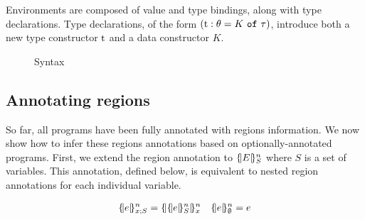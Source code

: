 
Environments are composed of value and type bindings, along with type
declarations. Type declarations, of the form
$\tydecl{t}{\kschm}{K}{\tau}$, introduce both a new type constructor $\T{t}$ and
a data constructor $K$.

\begin{figure*}[t]
  \centering
  
  \caption{Syntax}
  \label{grammar}
\end{figure*}

\clearpage

\subsection{Annotating regions}
\label{regionannot}

So far, all \lang programs have been fully annotated with regions information.
We now show how to infer these regions annotations based on
optionally-annotated programs.
First, we extend the region annotation to $\region{S}{E}$ where $S$ is
a set of variables. This annotation, defined below, is equivalent to nested
region annotations for each individual variable.

\begin{align*}
  \region{x;S}{e} &= \region{x}{\region{S}{e}}& \region{\emptyset}{e} &= e\\
\end{align*}


